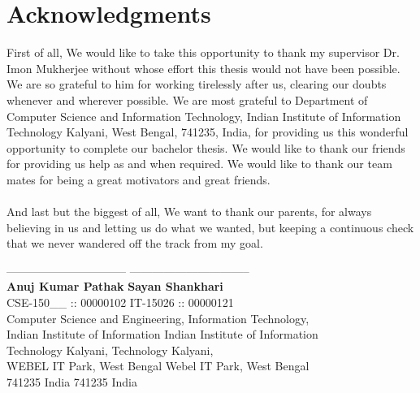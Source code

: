 \chapter*{Acknowledgments}
First of all, We would like to take this opportunity to thank my supervisor Dr. Imon Mukherjee without whose effort this thesis would not have been possible. We are so grateful to him for working tirelessly after us, clearing our doubts whenever and wherever possible. We are most grateful to Department of Computer Science and Information Technology, Indian Institute of Information Technology Kalyani, West Bengal, 741235, India, for providing us this wonderful opportunity to complete our bachelor thesis. We would like to thank our friends for providing us help as and when required. We would like to thank our team mates for being a great motivators and great friends. \\
\\
\linebreak And last but the biggest of all, We want to thank our parents, for always believing in us and letting us do what we wanted, but keeping a continuous check that we never wandered off the track from my goal. \\

\bigskip
\bigskip
\bigskip
\bigskip

\noindent
-------------------------------- \hfill -------------------------------- \\
\textbf{Anuj Kumar Pathak} \hfill \textbf{Sayan Shankhari} \\
CSE-150\_\_ :: 00000102 \hfill IT-15026 :: 00000121 \\
Computer Science and Engineering, \hfill Information Technology, \\
Indian Institute of Information \hfill Indian Institute of Information\\
Technology Kalyani, \hfill Technology Kalyani, \\
WEBEL IT Park, West Bengal \hfill Webel IT Park, West Bengal \\
741235 India \hfill 741235 India
